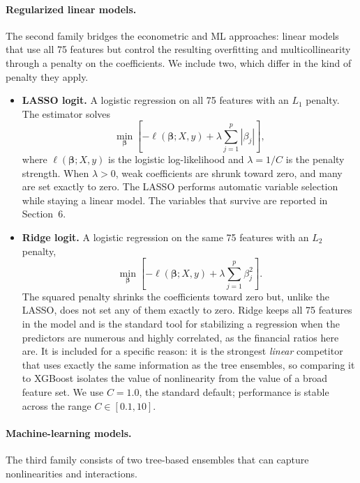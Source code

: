 \documentclass[12pt,a4paper]{article}
\begin{document}
\paragraph{Regularized linear models.} The second family bridges the
econometric and ML approaches: linear models that use all 75 features but
control the resulting overfitting and multicollinearity through a penalty on
the coefficients. We include two, which differ in the kind of penalty they
apply.

\begin{itemize}
\item \textbf{LASSO logit.} A logistic regression on all 75 features with an
$L_1$ penalty. The estimator solves
\begin{equation}
\min_{\boldsymbol{\beta}} \left[-\ell(\boldsymbol{\beta}; X, y)
+ \lambda \sum_{j=1}^{p} |\beta_j|\right],
\label{eq:lasso-objective}
\end{equation}
where $\ell(\boldsymbol{\beta}; X, y)$ is the logistic log-likelihood and
$\lambda = 1/C$ is the penalty strength. When $\lambda>0$, weak coefficients
are shrunk toward zero, and many are set exactly to zero. The LASSO performs automatic variable selection while staying a linear model.
The variables that survive are reported in Section~6.

\item \textbf{Ridge logit.} A logistic regression on the same 75 features with
an $L_2$ penalty,
\begin{equation}
\min_{\boldsymbol{\beta}} \left[-\ell(\boldsymbol{\beta}; X, y)
+ \lambda \sum_{j=1}^{p} \beta_j^2\right].
\label{eq:ridge-objective}
\end{equation}
The squared penalty shrinks the coefficients toward zero but, unlike the
LASSO, does not set any of them exactly to zero. Ridge keeps all 75 features
in the model and is the standard tool for stabilizing a regression when the
predictors are numerous and highly correlated, as the financial ratios here
are. It is included for a specific reason: it is the strongest \emph{linear}
competitor that uses exactly the same information as the tree ensembles, so
comparing it to XGBoost isolates the value of nonlinearity from the value of a
broad feature set. We use $C=1.0$, the standard default; performance is stable
across the range $C \in [0.1, 10]$.
\end{itemize}

\paragraph{Machine-learning models.} The third family consists of two
tree-based ensembles that can capture nonlinearities and interactions.
\end{document}
